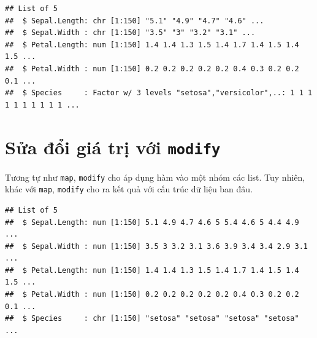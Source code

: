\documentclass[]{krantz}
\makeatletter
\newenvironment{Shaded}{\begin{snugshade}}{\end{snugshade}}
\newcommand{\CommentTok}[1]{\textcolor[rgb]{0.37,0.37,0.37}{\textit{#1}}}
\newcommand{\DecValTok}[1]{\textcolor[rgb]{0.06,0.06,0.06}{#1}}
\newcommand{\KeywordTok}[1]{\textcolor[rgb]{0.27,0.27,0.27}{\textbf{#1}}}
\newcommand{\NormalTok}[1]{#1}
\newcommand{\OperatorTok}[1]{\textcolor[rgb]{0.43,0.43,0.43}{\textbf{#1}}}
\newcommand{\StringTok}[1]{\textcolor[rgb]{0.5,0.5,0.5}{#1}}
\newenvironment{kframe}{%
\medskip{}
\setlength{\fboxsep}{.8em}
 \def\at@end@of@kframe{}%
 \ifinner\ifhmode%
  \def\at@end@of@kframe{\end{minipage}}%
  \begin{minipage}{\columnwidth}%
 \fi\fi%
 \def\FrameCommand##1{\hskip\@totalleftmargin \hskip-\fboxsep
 \colorbox{shadecolor}{##1}\hskip-\fboxsep
     \hskip-\linewidth \hskip-\@totalleftmargin \hskip\columnwidth}%
 \MakeFramed {\advance\hsize-\width
   \@totalleftmargin\z@ \linewidth\hsize
   \@setminipage}}%
 {\par\unskip\endMakeFramed%
 \at@end@of@kframe}
\renewenvironment{Shaded}{\begin{kframe}}{\end{kframe}}
\renewenvironment{Shaded}{\begin{snugshade}}{\end{snugshade}}
\renewcommand{\CommentTok}[1]{\textcolor[rgb]{0.56,0.35,0.01}{\textit{#1}}}
\renewcommand{\DecValTok}[1]{\textcolor[rgb]{0.00,0.00,0.81}{#1}}
\renewcommand{\KeywordTok}[1]{\textcolor[rgb]{0.13,0.29,0.53}{\textbf{#1}}}
\renewcommand{\NormalTok}[1]{#1}
\renewcommand{\OperatorTok}[1]{\textcolor[rgb]{0.81,0.36,0.00}{\textbf{#1}}}
\renewcommand{\StringTok}[1]{\textcolor[rgb]{0.31,0.60,0.02}{#1}}
\theoremstyle{definition}
\theoremstyle{definition}
\theoremstyle{definition}
\theoremstyle{remark}
\makeatother
\begin{document}
\begin{Shaded}
\end{Shaded}

\begin{verbatim}
## List of 5
##  $ Sepal.Length: chr [1:150] "5.1" "4.9" "4.7" "4.6" ...
##  $ Sepal.Width : chr [1:150] "3.5" "3" "3.2" "3.1" ...
##  $ Petal.Length: num [1:150] 1.4 1.4 1.3 1.5 1.4 1.7 1.4 1.5 1.4 1.5 ...
##  $ Petal.Width : num [1:150] 0.2 0.2 0.2 0.2 0.2 0.4 0.3 0.2 0.2 0.1 ...
##  $ Species     : Factor w/ 3 levels "setosa","versicolor",..: 1 1 1 1 1 1 1 1 1 1 ...
\end{verbatim}

\hypertarget{sa-i-gia-tri-vi-modify}{%
\section{\texorpdfstring{Sửa đổi giá trị với
\texttt{modify}}{Sửa đổi giá trị với modify}}\label{sa-i-gia-tri-vi-modify}}

Tương tự như \texttt{map}, \texttt{modify} cho áp dụng hàm vào một nhóm
các list. Tuy nhiên, khác với \texttt{map}, \texttt{modify} cho ra kết
quả với cấu trúc dữ liệu ban đâu.

\begin{Shaded}
\end{Shaded}

\begin{verbatim}
## List of 5
##  $ Sepal.Length: num [1:150] 5.1 4.9 4.7 4.6 5 5.4 4.6 5 4.4 4.9 ...
##  $ Sepal.Width : num [1:150] 3.5 3 3.2 3.1 3.6 3.9 3.4 3.4 2.9 3.1 ...
##  $ Petal.Length: num [1:150] 1.4 1.4 1.3 1.5 1.4 1.7 1.4 1.5 1.4 1.5 ...
##  $ Petal.Width : num [1:150] 0.2 0.2 0.2 0.2 0.2 0.4 0.3 0.2 0.2 0.1 ...
##  $ Species     : chr [1:150] "setosa" "setosa" "setosa" "setosa" ...
\end{verbatim}
\end{document}
